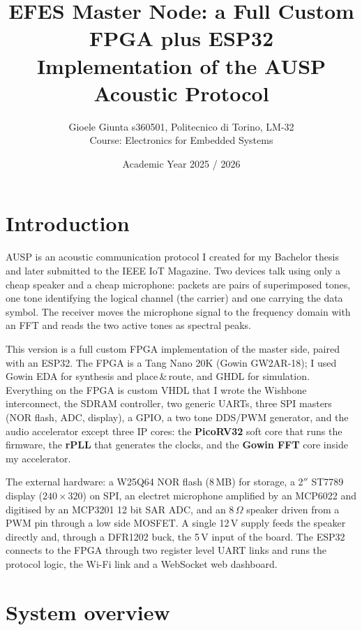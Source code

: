 \documentclass[a4paper,10pt]{article}
\title{\vspace{-1.2cm}\textbf{EFES Master Node: a Full Custom FPGA plus ESP32\\Implementation of the AUSP Acoustic Protocol}}
\author{Gioele Giunta s360501, Politecnico di Torino, LM-32\\ \small Course: Electronics for Embedded Systems}
\date{Academic Year 2025 / 2026}
\begin{document}
\maketitle
\thispagestyle{empty}


\section{Introduction}

AUSP is an acoustic communication protocol I created for my Bachelor thesis and later
submitted to the IEEE IoT Magazine. Two devices talk using only a cheap speaker and a
cheap microphone: packets are pairs of superimposed tones, one tone identifying the
logical channel (the carrier) and one carrying the data symbol. The receiver
moves the microphone signal to the frequency domain with an FFT and reads the two
active tones as spectral peaks.

This version is a full custom FPGA implementation of the master side, paired
with an ESP32. The FPGA is a Tang Nano 20K (Gowin GW2AR-18); I used Gowin EDA for
synthesis and place\,\&\,route, and GHDL for simulation. Everything on the FPGA is
custom VHDL that I wrote the Wishbone interconnect, the SDRAM controller, two
generic UARTs, three SPI masters (NOR flash, ADC, display), a GPIO, a two tone DDS/PWM
generator, and the audio accelerator except three IP cores: the \textbf{PicoRV32}
soft core that runs the firmware, the \textbf{rPLL} that generates the clocks, and the
\textbf{Gowin FFT} core inside my accelerator.

The external hardware: a W25Q64 NOR flash (8\,MB) for storage, a 2$''$ ST7789 display
($240\times320$) on SPI, an electret microphone amplified by an MCP6022 and digitised
by an MCP3201 12 bit SAR ADC, and an 8\,$\Omega$ speaker driven from a PWM pin through
a low side MOSFET. A single 12\,V supply feeds the speaker directly and, through a
DFR1202 buck, the 5\,V input of the board. The ESP32 connects to the FPGA through two
register level UART links and runs the protocol logic, the Wi-Fi link and a WebSocket
web dashboard.

\section{System overview}
\end{document}
